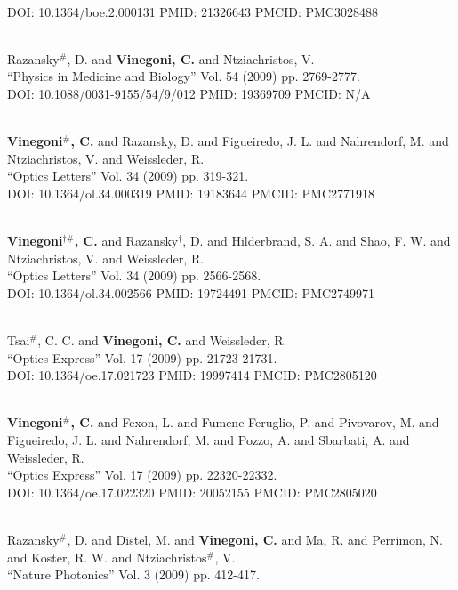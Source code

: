 \\ DOI: 10.1364/boe.2.000131 PMID: 21326643 PMCID: PMC3028488\item {} \\ Razansky$^\#$, D. and {\bf Vinegoni, C.} and Ntziachristos, V. \\ ``Physics in Medicine and Biology'' Vol. 54 (2009) pp. 2769-2777. \\ DOI: 10.1088/0031-9155/54/9/012 PMID: 19369709 PMCID: N/A\item {} \\ {\bf Vinegoni$^\#$, C.} and Razansky, D. and Figueiredo, J. L. and Nahrendorf, M. and Ntziachristos, V. and Weissleder, R. \\ ``Optics Letters'' Vol. 34 (2009) pp. 319-321. \\ DOI: 10.1364/ol.34.000319 PMID: 19183644 PMCID: PMC2771918\item {} \\ {\bf Vinegoni$^{\dag \#}$, C.} and Razansky$^\dag$, D. and Hilderbrand, S. A. and Shao, F. W. and Ntziachristos, V. and Weissleder, R. \\ ``Optics Letters'' Vol. 34 (2009) pp. 2566-2568. \\ DOI: 10.1364/ol.34.002566 PMID: 19724491 PMCID: PMC2749971\item {} \\ Tsai$^\#$, C. C. and {\bf Vinegoni, C.} and Weissleder, R. \\ ``Optics Express'' Vol. 17 (2009) pp. 21723-21731. \\ DOI: 10.1364/oe.17.021723 PMID: 19997414 PMCID: PMC2805120\item {} \\ {\bf Vinegoni$^\#$, C.} and Fexon, L. and Fumene Feruglio, P. and Pivovarov, M. and Figueiredo, J. L. and Nahrendorf, M. and Pozzo, A. and Sbarbati, A. and Weissleder, R. \\ ``Optics Express'' Vol. 17 (2009) pp. 22320-22332. \\ DOI: 10.1364/oe.17.022320 PMID: 20052155 PMCID: PMC2805020\item {} \\ Razansky$^\#$, D. and Distel, M. and {\bf Vinegoni, C.} and Ma, R. and Perrimon, N. and Koster, R. W. and Ntziachristos$^\#$, V. \\ ``Nature Photonics'' Vol. 3 (2009) pp. 412-417. 